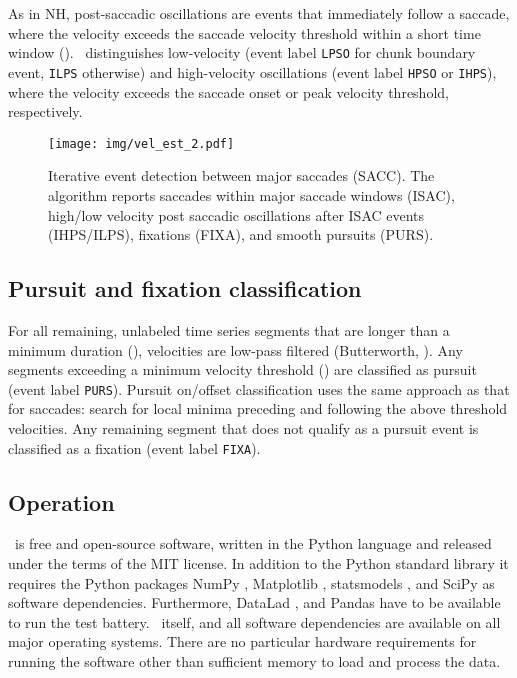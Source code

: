 As in NH, post-saccadic oscillations are events that immediately follow a
saccade, where the velocity exceeds the saccade velocity threshold within a short
time window (). \remodnav\ distinguishes low-velocity
(event label \texttt{LPSO} for chunk boundary event, \texttt{ILPS} otherwise)
and high-velocity oscillations (event label \texttt{HPSO} or \texttt{IHPS}),
where the velocity exceeds the saccade onset or peak velocity threshold,
respectively.

\begin{figure}
  \texttt{[image: img/vel\_est\_2.pdf]}
  \caption{Iterative event detection between major saccades (SACC).
  The algorithm reports saccades within major saccade windows (ISAC),
  high/low velocity post saccadic oscillations after ISAC events (IHPS/ILPS),
  fixations (FIXA), and smooth pursuits (PURS).}
  \label{fig:velest2}
\end{figure}

\subsection*{Pursuit and fixation classification}

For all remaining, unlabeled time series segments that are longer than a
minimum duration (), velocities are low-pass
filtered (Butterworth, ). Any segments
exceeding a minimum velocity threshold () are
classified as pursuit (event label \texttt{PURS}). Pursuit on/offset classification
uses the same approach as that for saccades: search for local minima preceding
and following the above threshold velocities.
%
Any remaining segment that does not qualify as a pursuit event is classified
as a fixation (event label \texttt{FIXA}).


\subsection*{Operation}\label{op}

\remodnav\ is free and open-source software, written in the Python language and
released under the terms of the MIT license. In addition to the Python standard
library it requires the Python packages
%
NumPy \citep{oliphant2006guide},
Matplotlib \citep{hunter2007matplotlib},
statsmodels \citep{seabold2010statsmodels},
and SciPy \citep{JOP+2001} as software dependencies.
Furthermore, DataLad \citep{HH+2013},
and Pandas \citep{mckinney2010data}
%
have to be available to run the test
battery. \remodnav\ itself, and all software dependencies are available on all
major operating systems.  There are no particular hardware requirements for
running the software other than sufficient memory to load and process the data.

